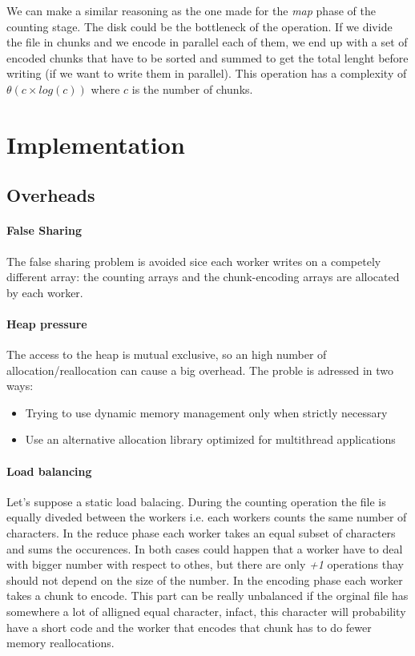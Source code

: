 \documentclass[12pt, letterpaper]{article}  %
\begin{document}
We can make a similar reasoning as the one made for the \textit{map} phase of the counting stage. The disk could be the bottleneck of the operation.
If we divide the file in chunks and we encode in parallel each of them, we end up with a set of encoded chunks that have to be sorted and summed to 
get the total lenght before writing (if we want to write them in parallel). This operation has a complexity of $\theta(c \times log(c))$ where $c$ is the number of chunks.


\section{Implementation}

\subsection{Overheads}

\paragraph*{False Sharing}
The false sharing problem is avoided sice each worker writes on a competely different array: the counting arrays
and the chunk-encoding arrays are allocated by each worker.

\paragraph*{Heap pressure}
The access to the heap is mutual exclusive, so an high number of allocation/reallocation can cause a big overhead.
The proble is adressed in two ways:
\begin{itemize}
    \item Trying to use dynamic memory management only when strictly necessary
    \item Use an alternative allocation library optimized for multithread applications
\end{itemize}

\paragraph*{Load balancing}
Let's suppose a static load balacing. During the counting operation the file is equally diveded between the workers i.e. each workers counts the same
number of characters. In the reduce phase each worker takes an equal subset of characters and sums the occurences.
In both cases could happen that a worker have to deal with bigger number with respect to othes, but there are 
only \textit{+1} operations thay should not depend on the size of the number. In the encoding phase each
worker takes a chunk to encode. This part can be really unbalanced if the orginal file has somewhere a lot of 
alligned equal character, infact, this character will probability have a short code and the worker 
that encodes that chunk has to do fewer memory reallocations.
\end{document}
